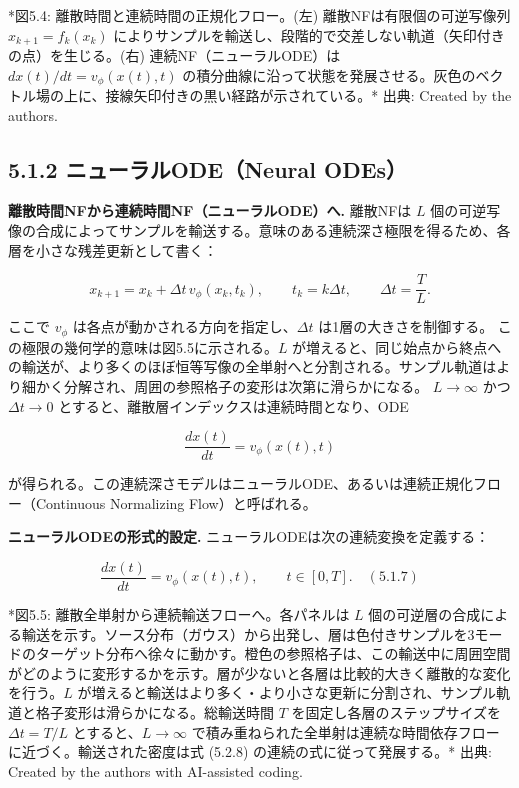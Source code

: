 *図5.4: 離散時間と連続時間の正規化フロー。(左) 離散NFは有限個の可逆写像列 $x_{k+1}=f_k(x_k)$ によりサンプルを輸送し、段階的で交差しない軌道（矢印付きの点）を生じる。(右) 連続NF（ニューラルODE）は $dx(t)/dt = v_\phi(x(t), t)$ の積分曲線に沿って状態を発展させる。灰色のベクトル場の上に、接線矢印付きの黒い経路が示されている。*
出典: Created by the authors.

\subsection*{5.1.2 ニューラルODE（Neural ODEs）}


\textbf{離散時間NFから連続時間NF（ニューラルODE）へ.} 離散NFは $L$ 個の可逆写像の合成によってサンプルを輸送する。意味のある連続深さ極限を得るため、各層を小さな残差更新として書く：

\[
x_{k+1} = x_k + \Delta t\, v_\phi(x_k, t_k), \qquad t_k = k\Delta t, \qquad \Delta t = \frac{T}{L}.
\]


ここで $v_\phi$ は各点が動かされる方向を指定し、$\Delta t$ は1層の大きさを制御する。
この極限の幾何学的意味は図5.5に示される。$L$ が増えると、同じ始点から終点への輸送が、より多くのほぼ恒等写像の全単射へと分割される。サンプル軌道はより細かく分解され、周囲の参照格子の変形は次第に滑らかになる。
$L \to \infty$ かつ $\Delta t \to 0$ とすると、離散層インデックスは連続時間となり、ODE

\[
\frac{dx(t)}{dt} = v_\phi(x(t), t)
\]


が得られる。この連続深さモデルはニューラルODE、あるいは連続正規化フロー（Continuous Normalizing Flow）と呼ばれる。

\textbf{ニューラルODEの形式的設定.} ニューラルODEは次の連続変換を定義する：

\[
\frac{dx(t)}{dt} = v_\phi(x(t), t), \qquad t \in [0, T]. \quad (5.1.7)
\]




*図5.5: 離散全単射から連続輸送フローへ。各パネルは $L$ 個の可逆層の合成による輸送を示す。ソース分布（ガウス）から出発し、層は色付きサンプルを3モードのターゲット分布へ徐々に動かす。橙色の参照格子は、この輸送中に周囲空間がどのように変形するかを示す。層が少ないと各層は比較的大きく離散的な変化を行う。$L$ が増えると輸送はより多く・より小さな更新に分割され、サンプル軌道と格子変形は滑らかになる。総輸送時間 $T$ を固定し各層のステップサイズを $\Delta t=T/L$ とすると、$L\to\infty$ で積み重ねられた全単射は連続な時間依存フローに近づく。輸送された密度は式 (5.2.8) の連続の式に従って発展する。*
出典: Created by the authors with AI-assisted coding.

